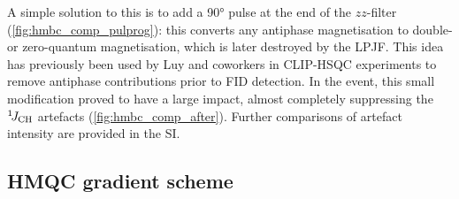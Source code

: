 \documentclass[a4paper,11pt]{article}
\newcommand{\carbon}{\ce{^{13}C}}
\newcommand{\nitrogen}{\ce{^{15}N}}
\newcommand{\todo}[1]{\textcolor{WildStrawberry}{#1}}
\newcommand{\onejch}{{}^1\!J_{\ce{CH}}}
\begin{document}
A simple solution to this is to add a \carbon{} \ang{90} pulse at the end of the $zz$-filter (\cref{fig:hmbc_comp_pulprog}): this converts any antiphase magnetisation to double- or zero-quantum magnetisation, which is later destroyed by the LPJF.
This idea has previously been used by Luy and coworkers in CLIP-HSQC experiments to remove antiphase contributions prior to FID detection.\autocite{Enthart2008JMR}
In the event, this small modification proved to have a large impact, almost completely suppressing the $\onejch$ artefacts (\cref{fig:hmbc_comp_after}).
\todo{Further comparisons of artefact intensity are provided in the SI.}

\subsection{\texorpdfstring{\nitrogen{}}{15N} HMQC gradient scheme}
\end{document}
